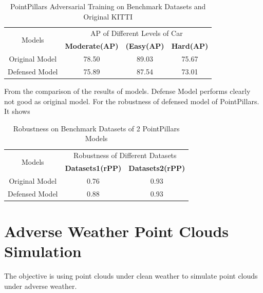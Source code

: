  \begin{table}[!htbp]
  \begin{center}
    
    \begin{tabular}{|c|c|c|c|} %
      \hline
      \multirow{2}{*}{Models} & \multicolumn{3}{c|}{AP of Different Levels of Car}\\
    \cline{2-4}
       &\textbf{Moderate(AP)} & \textbf{(Easy(AP)}& \textbf{Hard(AP)}\\
      \hline
      Original Model & 78.50 & 89.03 & 75.67\\
      Defensed Model & 75.89 & 87.54&  73.01\\
    \hline
    \end{tabular}
\caption{PointPillars Adversarial Training on Benchmark Datasets and Original KITTI}
  \end{center}
  \label{tab:Benchmark Adversarial Training}
\end{table}
From the comparison of the results of models. Defense Model performs clearly not good as original model.
For the robustness of defensed model of PointPillars. It shows
 \begin{table}[!htbp]
  \begin{center}
    
    \begin{tabular}{|c|c|c|} %
      \hline
      \multirow{2}{*}{Models} &\multicolumn{2}{c|}{Robustness of Different Datasets}\\
    \cline{2-3}
      &\textbf{Datasets1(rPP)}&\textbf{Datasets2(rPP)}\\
      \hline
      Original Model&0.76&0.93\\
      Defensed Model&0.88&0.93\\
    \hline
    \end{tabular}
\caption{Robustness on Benchmark Datasets of 2 PointPillars Models}
  \end{center}
  \label{tab:robustness pointpillar}
\end{table}
\section{Adverse Weather Point Clouds Simulation}
The objective is using point clouds under clean weather to simulate point clouds under adverse weather.

